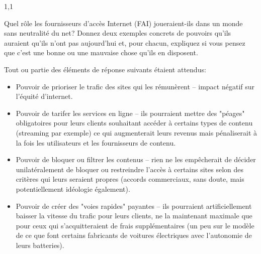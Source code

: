 \documentclass[11pt,a4paper]{exam}
\begin{document}
\begin{spacing}{1,1}
\begin{questions}
        	
        	\question[2]Quel rôle les fournisseurs d'accès Internet (FAI) joueraient-ils dans un monde sans neutralité du net? Donnez deux exemples concrets de pouvoirs qu'ils auraient qu'ils n'ont pas aujourd'hui et, pour chacun, expliquez si vous pensez que c'est une bonne ou une mauvaise chose qu'ils en disposent.
			\begin{solution}
				Tout ou partie des éléments de réponse suivants étaient attendus:
				\begin{itemize}
					\item Pouvoir de prioriser le trafic des sites qui les rémunèrent -- impact négatif sur l'équité d'internet.
					\item Pouvoir de tarifer les services en ligne -- ils pourraient mettre des "péages" obligatoires pour leurs clients souhaitant accéder à certains types de contenu (streaming par exemple) ce qui augmenterait leurs revenus mais pénaliserait à la fois les utilisateurs et les fournisseurs de contenu.
					\item Pouvoir de bloquer ou filtrer les contenus -- rien ne les empêcherait de décider unilatéralement de bloquer ou restreindre l'accès à certains sites selon des critères qui leurs seraient propres (accords commerciaux, sans doute, mais potentiellement idéologie également).
					\item Pouvoir de créer des "voies rapides" payantes -- ils pourraient artificiellement baisser la vitesse du trafic pour leurs clients, ne la maintenant maximale que pour ceux qui s'acquitteraient de frais supplémentaires (un peu sur le modèle de ce que font certains fabricants de voitures électriques avec l'autonomie de leurs batteries).
				\end{itemize}
			\end{solution}
        	

\end{questions}
\end{spacing}
\end{document}
